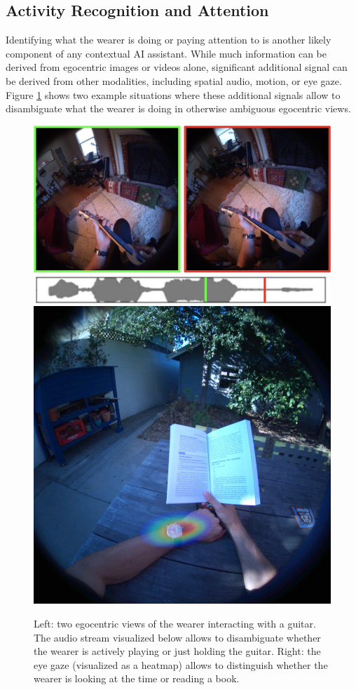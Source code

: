 \subsection{Activity Recognition and Attention}
Identifying what the wearer is doing or paying attention to is another likely component of any contextual AI assistant. While much information can be derived from egocentric images or videos alone, significant additional signal can be derived from other modalities, including spatial audio, motion, or eye gaze. 
Figure \ref{fig:activity} shows two example situations where these additional signals allow to disambiguate what the wearer is doing in otherwise ambiguous egocentric views.

\begin{figure}
    \centering
    \includegraphics[height=0.37\linewidth]{images/applications/activity_guitar.jpg}\hfill\includegraphics[height=0.37\linewidth]{images/applications/activity_seetime.jpg}
    \caption{Left: two egocentric views of the wearer interacting with a guitar. The audio stream visualized below allows to disambiguate whether the wearer is actively playing or just holding the guitar. Right: the eye gaze (visualized as a heatmap) allows to distinguish whether the wearer is looking at the time or reading a book.}
    \label{fig:activity}
\end{figure}




